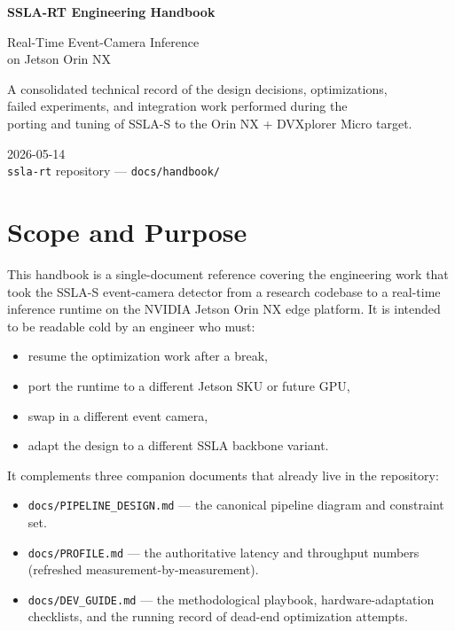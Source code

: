 \documentclass[11pt,a4paper]{article}
\begin{document}
\begin{titlepage}
\vspace*{4cm}
\begin{center}
\Huge\bfseries SSLA-RT Engineering Handbook
\par\vspace{1.5cm}
\Large
Real-Time Event-Camera Inference\\on Jetson Orin NX
\par\vspace{2.5cm}
\large
A consolidated technical record of the design decisions, optimizations,\\
failed experiments, and integration work performed during the\\
porting and tuning of SSLA-S to the Orin NX + DVXplorer Micro target.
\par\vspace{4cm}
\normalsize
2026-05-14\\[0.4cm]
\texttt{ssla-rt} repository --- \texttt{docs/handbook/}
\end{center}
\end{titlepage}

\tableofcontents
\clearpage

\section{Scope and Purpose}

This handbook is a single-document reference covering the engineering work
that took the SSLA-S event-camera detector from a research codebase to a
real-time inference runtime on the NVIDIA Jetson Orin NX edge platform.
It is intended to be readable cold by an engineer who must:

\begin{itemize}[itemsep=0pt]
  \item resume the optimization work after a break,
  \item port the runtime to a different Jetson SKU or future GPU,
  \item swap in a different event camera,
  \item adapt the design to a different SSLA backbone variant.
\end{itemize}

It complements three companion documents that already live in the
repository:

\begin{itemize}[itemsep=0pt]
  \item \texttt{docs/PIPELINE\_DESIGN.md} --- the canonical pipeline diagram
        and constraint set.
  \item \texttt{docs/PROFILE.md} --- the authoritative latency and
        throughput numbers (refreshed measurement-by-measurement).
  \item \texttt{docs/DEV\_GUIDE.md} --- the methodological playbook,
        hardware-adaptation checklists, and the running record of
        dead-end optimization attempts.
\end{itemize}
\end{document}
